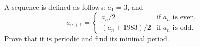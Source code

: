 A sequence is defined as follows: $a_1 = 3$, and
\[ a_{n+1} = \begin{cases} a_n/2 & \text{if } a_n \text{ is even,}\\ (a_n + 1983)/2 & \text{if } a_n \text{ is odd.} \end{cases} \]
Prove that it is periodic and find its minimal period.
